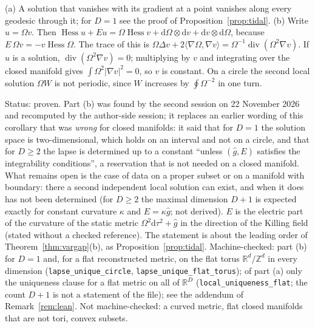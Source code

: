 \documentclass[11pt,a4paper]{article}
\makeatletter
\theoremstyle{stmt}
\theoremstyle{defn}
\theoremstyle{rmk}
\renewenvironment{proof}[1][\proofname]{\par\pushQED{\qed}\normalfont\topsep6\p@\@plus6\p@\relax
  \trivlist\item[\hskip\labelsep{\sffamily\itshape\small #1.}]\ignorespaces}{\popQED\endtrivlist\@endpefalse}
\numberwithin{equation}{section}
\newcommand{\status}[1]{\par\noindent\textsf{\small Status: #1}\par}
\newcommand{\R}{\mathbb{R}}
\newcommand{\dd}{\mathrm{d}}
\makeatother
\begin{document}
{\begin{proof}
(a) A solution that vanishes with its gradient at a point vanishes along every geodesic through it; for $D=1$ see the proof of Proposition~\ref{prop:tidal}. (b) Write $u=\Omega v$. Then $\operatorname{Hess}u+Eu=\Omega\operatorname{Hess}v+\dd\Omega\otimes\dd v+\dd v\otimes\dd\Omega$, because $E\,\Omega v=-v\operatorname{Hess}\Omega$. The trace of this is $\Omega\Delta v+2\langle\nabla\Omega,\nabla v\rangle=\Omega^{-1}\operatorname{div}(\Omega^2\nabla v)$. If $u$ is a solution, $\operatorname{div}(\Omega^2\nabla v)=0$; multiplying by $v$ and integrating over the closed manifold gives $\int\Omega^2|\nabla v|^2=0$, so $v$ is constant. On a circle the second local solution $\Omega W$ is not periodic, since $W$ increases by $\oint\Omega^{-2}$ in one turn.
\end{proof}
\status{proven. Part (b) was found by the second session on 22 November 2026 and recomputed by the author-side session; it replaces an earlier wording of this corollary that was \emph{wrong} for closed manifolds: it said that for $D=1$ the solution space is two-dimensional, which holds on an interval and not on a circle, and that for $D\ge2$ the lapse is determined up to a constant ``unless $(\hat g,E)$ satisfies the integrability conditions'', a reservation that is not needed on a closed manifold. What remains open is the case of data on a proper subset or on a manifold with boundary: there a second independent local solution can exist, and when it does has not been determined (for $D\ge2$ the maximal dimension $D+1$ is expected exactly for constant curvature $\kappa$ and $E=\kappa\hat g$; not derived). $E$ is the electric part of the curvature of the static metric $\Omega^2\dd\tau^2+\hat g$ in the direction of the Killing field (stated without a checked reference). The statement is about the leading order of Theorem~\ref{thm:vargap}(b), as Proposition~\ref{prop:tidal}. Machine-checked: part (b) for $D=1$ and, for a flat reconstructed metric, on the flat torus $\R^d/\mathbb Z^d$ in every dimension (\texttt{lapse\_unique\_circle}, \texttt{lapse\_unique\_flat\_torus}); of part (a) only the uniqueness clause for a flat metric on all of $\R^D$ (\texttt{local\_uniqueness\_flat}; the count $D+1$ is not a statement of the file); see the addendum of Remark~\ref{rem:lean}. Not machine-checked: a curved metric, flat closed manifolds that are not tori, convex subsets.}

}
\end{document}
